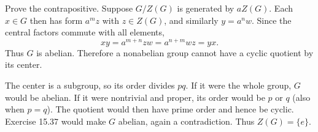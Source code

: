 Prove the contrapositive. Suppose $G/Z(G)$ is generated by $aZ(G)$. Each $x\in G$ then has form $a^mz$ with $z\in Z(G)$, and similarly $y=a^nw$. Since the central factors commute with all elements,
\[xy=a^{m+n}zw=a^{n+m}wz=yx.\]
Thus $G$ is abelian. Therefore a nonabelian group cannot have a cyclic quotient by its center.

The center is a subgroup, so its order divides $pq$. If it were the whole group, $G$ would be abelian. If it were nontrivial and proper, its order would be $p$ or $q$ (also when $p=q$). The quotient would then have prime order and hence be cyclic. Exercise 15.37 would make $G$ abelian, again a contradiction. Thus $Z(G)=\{e\}$.

